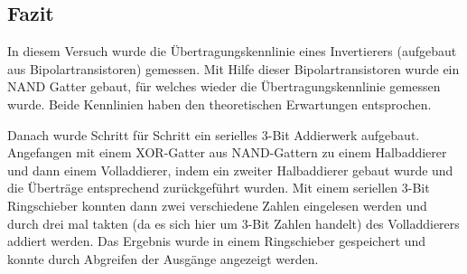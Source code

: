 \documentclass[10pt]{article}
\begin{document}
\begin{multicols}{2}
	\section{Fazit}
	In diesem Versuch wurde die Übertragungskennlinie eines Invertierers (aufgebaut aus Bipolartransistoren) gemessen.
	Mit Hilfe dieser Bipolartransistoren wurde ein NAND Gatter gebaut, für welches wieder die Übertragungskennlinie gemessen wurde.
	Beide Kennlinien haben den theoretischen Erwartungen entsprochen.
	\par Danach wurde Schritt für Schritt ein serielles 3-Bit Addierwerk aufgebaut.
	Angefangen mit einem XOR-Gatter aus NAND-Gattern zu einem Halbaddierer und dann einem Volladdierer, indem ein zweiter Halbaddierer gebaut wurde und die Überträge entsprechend zurückgeführt wurden.
	Mit einem seriellen 3-Bit Ringschieber konnten dann zwei verschiedene Zahlen eingelesen werden und durch drei mal takten (da es sich hier um 3-Bit Zahlen handelt) des Volladdierers addiert werden.
	Das Ergebnis wurde in einem Ringschieber gespeichert und konnte durch Abgreifen der Ausgänge angezeigt werden.
\end{multicols}
\end{document}
